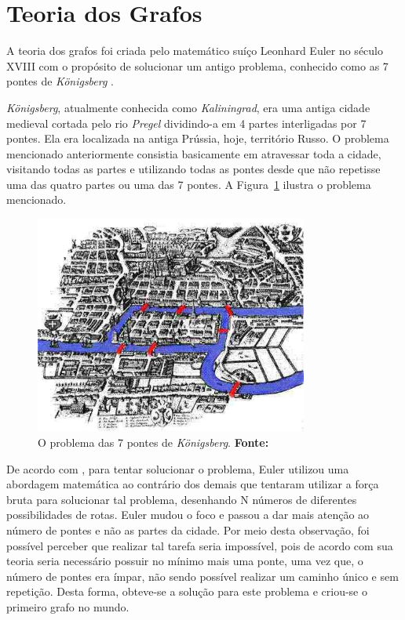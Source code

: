 \section{Teoria dos Grafos}

\par A teoria dos grafos foi criada pelo matemático suíço Leonhard Euler no século XVIII com o propósito de solucionar um antigo problema, conhecido como as 7 pontes de \textit{Königsberg} \cite{harju_graph_theory}.

\par \textit{Königsberg}, atualmente conhecida como \textit{Kaliningrad}, era uma antiga cidade medieval cortada pelo rio \textit{Pregel} dividindo-a em 4 partes interligadas por 7 pontes. Ela era localizada na antiga Prússia, hoje, território Russo. O problema mencionado anteriormente consistia basicamente em atravessar toda a cidade, visitando todas as partes e utilizando todas as pontes desde que não repetisse uma das quatro partes ou uma das 7 pontes. A Figura~\ref{fig:problema_sete_pontes} ilustra o problema mencionado.

\begin{figure}[h!]
	\centerline{\includegraphics[height=0.26\textheight,width=0.8\textwidth]{./imagens/Konigsberg_7_bridges.jpg}}
	\caption[O problema das 7 pontes de \textit{Königsberg} ]
	{O problema das 7 pontes de \textit{Königsberg}. \textbf{Fonte:} }
	\label{fig:problema_sete_pontes}
\end{figure}

\par De acordo com , para tentar solucionar o problema, Euler utilizou uma abordagem matemática ao contrário dos demais que tentaram utilizar a força bruta para solucionar tal problema, desenhando N números de diferentes possibilidades de rotas. Euler mudou o foco e passou a dar mais atenção ao número de pontes e não as partes da cidade. Por meio desta observação, foi possível perceber que realizar tal tarefa seria impossível, pois de acordo com sua teoria seria necessário possuir no mínimo mais uma ponte, uma vez que, o número de pontes era ímpar, não sendo possível realizar um caminho único e sem repetição. Desta forma, obteve-se a solução para este problema e criou-se o primeiro grafo no mundo.

